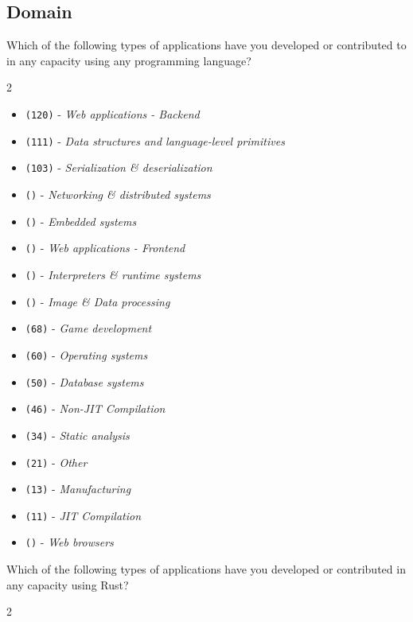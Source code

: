 \subsection{Domain}
\label{survey:sec:dmq}

\begin{protocol}
\item \label{survey:dmq1}  Which of the following types of applications have you developed or contributed to in any capacity using any programming language?
\begin{multicols}{2}
\begin{itemize}
\item \texttt{(120)} - \textit{Web applications - Backend}
\item \texttt{(111)} - \textit{Data structures and language-level primitives}
\item \texttt{(103)} - \textit{Serialization \& deserialization}
\item \texttt{()} - \textit{Networking \& distributed systems}
\item \texttt{()} - \textit{Embedded systems}
\item \texttt{()} - \textit{Web applications - Frontend}
\item \texttt{()} - \textit{Interpreters \& runtime systems}
\item \texttt{()} - \textit{Image \& Data processing}
\item \texttt{(68)} - \textit{Game development}
\item \texttt{(60)} - \textit{Operating systems}
\item \texttt{(50)} - \textit{Database systems}
\item \texttt{(46)} - \textit{Non-JIT Compilation}
\item \texttt{(34)} - \textit{Static analysis}
\item \texttt{(21)} - \textit{Other}
\item \texttt{(13)} - \textit{Manufacturing}
\item \texttt{(11)} - \textit{JIT Compilation}
\item \texttt{()} - \textit{Web browsers}
\end{itemize}
\end{multicols}
\item \label{survey:dmq2}   Which of the following types of applications have you developed or contributed in any capacity using Rust?
\begin{multicols}{2}

\end{multicols}
\end{protocol}

